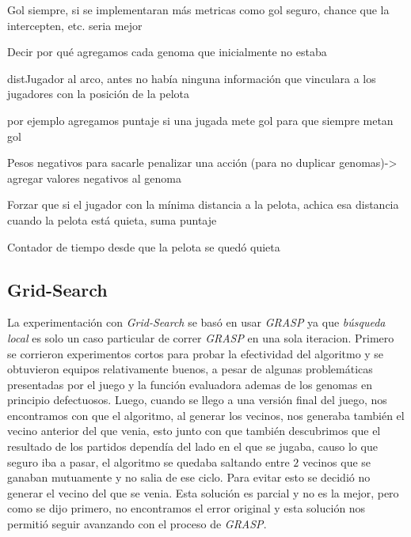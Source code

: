 Gol siempre, si se implementaran más metricas como gol seguro, chance que la intercepten, etc. seria mejor

Decir por qué agregamos cada genoma que inicialmente no estaba

distJugador al arco, antes no había ninguna información que vinculara a los jugadores con la posición de la pelota

por ejemplo agregamos puntaje si una jugada mete gol para que siempre metan gol

Pesos negativos para sacarle penalizar una acción (para no duplicar genomas)-> agregar valores negativos al genoma


Forzar que si el jugador con la mínima distancia a la pelota, achica esa distancia cuando la pelota está quieta, suma puntaje

Contador de tiempo desde que la pelota se quedó quieta




\subsection{Grid-Search}

La experimentación con \emph{Grid-Search} se basó en usar \emph{GRASP} ya que \emph{búsqueda local} es solo un caso particular
de correr \emph{GRASP} en una sola iteracion.
Primero se corrieron experimentos cortos para probar la efectividad del algoritmo y se obtuvieron equipos relativamente buenos,
a pesar de algunas problemáticas presentadas por el juego y la función evaluadora ademas de los genomas en principio defectuosos.
Luego, cuando se llego a una versión final del juego, nos encontramos con que el algoritmo, al generar los vecinos, nos generaba también
el vecino anterior del que venia, esto junto con que también descubrimos que el resultado de los partidos dependía del lado en el
que se jugaba, causo lo que seguro iba a pasar, el algoritmo se quedaba saltando entre $2$ vecinos que se ganaban mutuamente y no
salia de ese ciclo.
Para evitar esto se decidió no generar el vecino del que se venia. Esta solución es parcial y no es la mejor, pero como se dijo primero,
no encontramos el error original y esta solución nos permitió seguir avanzando con el proceso de \emph{GRASP}.
